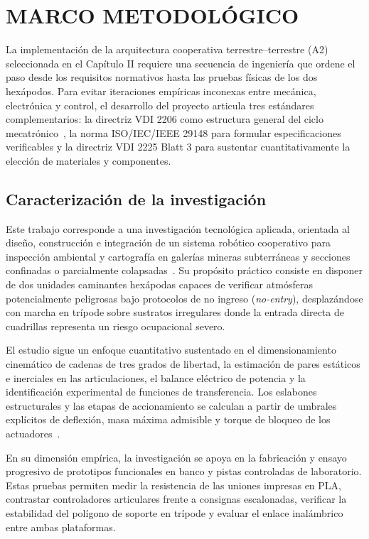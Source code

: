 \chapter{MARCO METODOLÓGICO}

La implementación de la arquitectura cooperativa terrestre--terrestre (A2) seleccionada en el Capítulo II requiere una secuencia de ingeniería que ordene el paso desde los requisitos normativos hasta las pruebas físicas de los dos hexápodos. Para evitar iteraciones empíricas inconexas entre mecánica, electrónica y control, el desarrollo del proyecto articula tres estándares complementarios: la directriz VDI 2206 como estructura general del ciclo mecatrónico~\cite{VDI2206_2004}, la norma ISO/IEC/IEEE 29148 para formular especificaciones verificables y la directriz VDI 2225 Blatt 3 para sustentar cuantitativamente la elección de materiales y componentes.


\section{Caracterización de la investigación}

Este trabajo corresponde a una investigación tecnológica aplicada, orientada al diseño, construcción e integración de un sistema robótico cooperativo para inspección ambiental y cartografía en galerías mineras subterráneas y secciones confinadas o parcialmente colapsadas~\cite{AdvancesMining_2023, MINEM_DS024_2016}. Su propósito práctico consiste en disponer de dos unidades caminantes hexápodas capaces de verificar atmósferas potencialmente peligrosas bajo protocolos de no ingreso (\textit{no-entry}), desplazándose con marcha en trípode sobre sustratos irregulares donde la entrada directa de cuadrillas representa un riesgo ocupacional severo.

El estudio sigue un enfoque cuantitativo sustentado en el dimensionamiento cinemático de cadenas de tres grados de libertad, la estimación de pares estáticos e inerciales en las articulaciones, el balance eléctrico de potencia y la identificación experimental de funciones de transferencia. Los eslabones estructurales y las etapas de accionamiento se calculan a partir de umbrales explícitos de deflexión, masa máxima admisible y torque de bloqueo de los actuadores~\cite{Sensors2021_HexapodReview, N20_Datasheet}.

En su dimensión empírica, la investigación se apoya en la fabricación y ensayo progresivo de prototipos funcionales en banco y pistas controladas de laboratorio. Estas pruebas permiten medir la resistencia de las uniones impresas en PLA, contrastar controladores articulares frente a consignas escalonadas, verificar la estabilidad del polígono de soporte en trípode y evaluar el enlace inalámbrico entre ambas plataformas.

